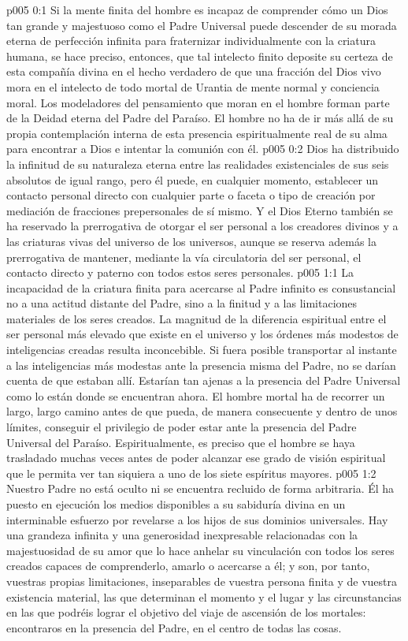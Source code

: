 \author{Consejero divino}
\vs p005 0:1 Si la mente finita del hombre es incapaz de comprender cómo un Dios tan grande y majestuoso como el Padre Universal puede descender de su morada eterna de perfección infinita para fraternizar individualmente con la criatura humana, se hace preciso, entonces, que tal intelecto finito deposite su certeza de esta compañía divina en el hecho verdadero de que una fracción del Dios vivo mora en el intelecto de todo mortal de Urantia de mente normal y conciencia moral. Los modeladores del pensamiento que moran en el hombre forman parte de la Deidad eterna del Padre del Paraíso. El hombre no ha de ir más allá de su propia contemplación interna de esta presencia espiritualmente real de su alma para encontrar a Dios e intentar la comunión con él.
\vs p005 0:2 Dios ha distribuido la infinitud de su naturaleza eterna entre las realidades existenciales de sus seis absolutos de igual rango, pero él puede, en cualquier momento, establecer un contacto personal directo con cualquier parte o faceta o tipo de creación por mediación de fracciones prepersonales de sí mismo. Y el Dios Eterno también se ha reservado la prerrogativa de otorgar el ser personal a los creadores divinos y a las criaturas vivas del universo de los universos, aunque se reserva además la prerrogativa de mantener, mediante la vía circulatoria del ser personal, el contacto directo y paterno con todos estos seres personales.
\vs p005 1:1 La incapacidad de la criatura finita para acercarse al Padre infinito es consustancial no a una actitud distante del Padre, sino a la finitud y a las limitaciones materiales de los seres creados. La magnitud de la diferencia espiritual entre el ser personal más elevado que existe en el universo y los órdenes más modestos de inteligencias creadas resulta inconcebible. Si fuera posible transportar al instante a las inteligencias más modestas ante la presencia misma del Padre, no se darían cuenta de que estaban allí. Estarían tan ajenas a la presencia del Padre Universal como lo están donde se encuentran ahora. El hombre mortal ha de recorrer un largo, largo camino antes de que pueda, de manera consecuente y dentro de unos límites, conseguir el privilegio de poder estar ante la presencia del Padre Universal del Paraíso. Espiritualmente, es preciso que el hombre se haya trasladado muchas veces antes de poder alcanzar ese grado de visión espiritual que le permita ver tan siquiera a uno de los siete espíritus mayores.
\vs p005 1:2 Nuestro Padre no está oculto ni se encuentra recluido de forma arbitraria. Él ha puesto en ejecución los medios disponibles a su sabiduría divina en un interminable esfuerzo por revelarse a los hijos de sus dominios universales. Hay una grandeza infinita y una generosidad inexpresable relacionadas con la majestuosidad de su amor que lo hace anhelar su vinculación con todos los seres creados capaces de comprenderlo, amarlo o acercarse a él; y son, por tanto, vuestras propias limitaciones, inseparables de vuestra persona finita y de vuestra existencia material, las que determinan el momento y el lugar y las circunstancias en las que podréis lograr el objetivo del viaje de ascensión de los mortales: encontraros en la presencia del Padre, en el centro de todas las cosas.
